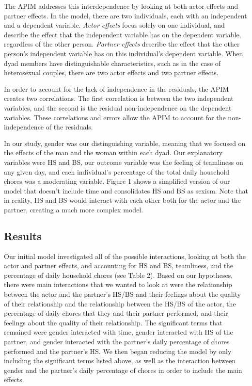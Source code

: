 \documentclass[
  english,
  man]{apa6}
\begin{document}
The APIM addresses this interdependence by looking at both actor effects and partner effects. In the model, there are two individuals, each with an independent and a dependent variable. \emph{Actor effects} focus solely on one individual, and describe the effect that the independent variable has on the dependent variable, regardless of the other person. \emph{Partner effects} describe the effect that the other person's independent variable has on this individual's dependent variable. When dyad members have distinguishable characteristics, such as in the case of heterosexual couples, there are two actor effects and two partner effects.

In order to account for the lack of independence in the residuals, the APIM creates two correlations. The first correlation is between the two independent variables, and the second is the residual non-independence on the dependent variables. These correlations and errors allow the APIM to account for the non-independence of the residuals.

In our study, gender was our distinguishing variable, meaning that we focused on the effects of the man and the woman within each dyad. Our explanatory variables were HS and BS, our outcome variable was the feeling of teamliness on any given day, and each individual's percentage of the total daily household chores was a moderating variable. Figure 1 shows a simplified version of our model that doesn't include time and consolidates HS and BS as sexism. Note that in reality, HS and BS would interact with each other both for the actor and the partner, creating a much more complex model.

\hypertarget{results-1}{%
\subsection{Results}\label{results-1}}

Our initial model investigated all of the possible interactions, looking at both the actor and partner effects, and accounting for HS and BS, teamliness, and the percentage of daily household chores (see Table 2). Based on our hypotheses, there were main interactions that we wanted to look at were the relationship between the actor and the partner's HS/BS and their feelings about the quality of their relationship and the relationship between the HS/BS of the actor, the percentage of daily chores that they and their partner performed, and their feelings about the quality of their relationship. The significant terms that remained were gender interacted with time, gender interacted with HS of the partner, and gender interacted with the partner's daily percentage of chores performed and the partner's HS. We then began reducing the model by only including the significant terms listed above, as well as the interaction between gender and the partner's daily percentage of chores in order to include the main effects.
\end{document}
